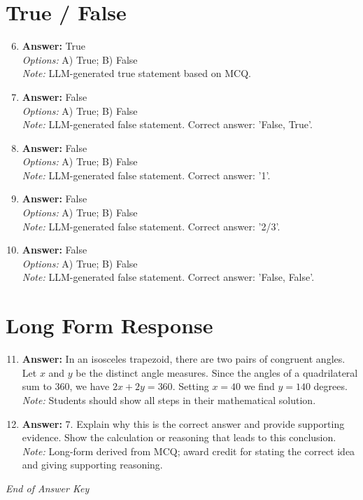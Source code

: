 \documentclass[12pt]{article}
\begin{document}
\section*{True / False}
\begin{enumerate}[label=\arabic*.]
\setcounter{enumi}{5}
\item \textbf{Answer:} True
\\ \textit{Options:} A) True; B) False
\\ \textit{Note:} LLM-generated true statement based on MCQ.
\item \textbf{Answer:} False
\\ \textit{Options:} A) True; B) False
\\ \textit{Note:} LLM-generated false statement. Correct answer: 'False, True'.
\item \textbf{Answer:} False
\\ \textit{Options:} A) True; B) False
\\ \textit{Note:} LLM-generated false statement. Correct answer: '1'.
\item \textbf{Answer:} False
\\ \textit{Options:} A) True; B) False
\\ \textit{Note:} LLM-generated false statement. Correct answer: '2/3'.
\item \textbf{Answer:} False
\\ \textit{Options:} A) True; B) False
\\ \textit{Note:} LLM-generated false statement. Correct answer: 'False, False'.
\end{enumerate}

\section*{Long Form Response}
\begin{enumerate}[label=\arabic*.]
\setcounter{enumi}{10}
\item \textbf{Answer:} In an isosceles trapezoid, there are two pairs of congruent angles. Let $x$ and $y$ be the distinct angle measures. Since the angles of a quadrilateral sum to 360, we have $2 x+2 y=360$. Setting $x=40$ we find $y=\boxed{140}$ degrees.
\\ \textit{Note:} Students should show all steps in their mathematical solution.
\item \textbf{Answer:} 7. Explain why this is the correct answer and provide supporting evidence. Show the calculation or reasoning that leads to this conclusion.
\\ \textit{Note:} Long-form derived from MCQ; award credit for stating the correct idea and giving supporting reasoning.
\end{enumerate}

\vfill
\noindent\textit{End of Answer Key}
\end{document}
